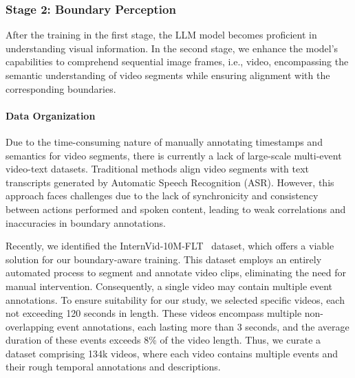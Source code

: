 \documentclass[10pt,twocolumn,letterpaper]{article}
\begin{document}
 
\subsubsection{Stage 2: Boundary Perception}

After the training in the first stage, the LLM model becomes proficient in understanding visual information. In the second stage, we enhance the model's capabilities to comprehend sequential image frames, i.e., video, encompassing the semantic understanding of video segments while ensuring alignment with the corresponding boundaries. 

\paragraph{Data Organization} Due to the time-consuming nature of manually annotating timestamps and semantics for video segments, there is currently a lack of large-scale multi-event video-text datasets. Traditional methods align video segments with text transcripts generated by Automatic Speech Recognition (ASR). However, this approach faces challenges due to the lack of synchronicity and consistency between actions performed and spoken content, leading to weak correlations and inaccuracies in boundary annotations.

Recently, we identified the InternVid-10M-FLT~\cite{wang2023internvid} dataset, which offers a viable solution for our boundary-aware training. This dataset employs an entirely automated process to segment and annotate video clips, eliminating the need for manual intervention. Consequently, a single video may contain multiple event annotations. To ensure suitability for our study, we selected specific videos, each not exceeding 120 seconds in length. These videos encompass multiple non-overlapping event annotations, each lasting more than 3 seconds, and the average duration of these events exceeds 8\% of the video length. Thus, we curate a dataset comprising 134k videos, where each video contains multiple events and their rough temporal annotations and descriptions.
\end{document}
